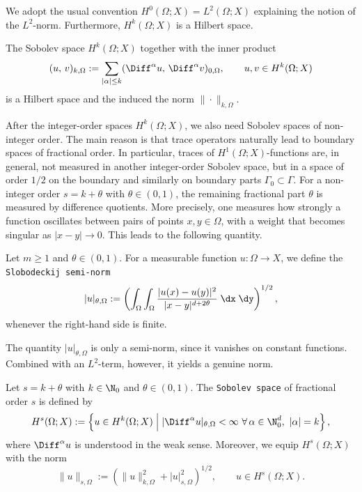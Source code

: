 We adopt the usual convention $H^0(\Omega;X) = L^2(\Omega;X)$ explaining the notion of the $L^2$-norm. Furthermore, $H^k(\Omega;X)$ is a Hilbert space.

\begin{proposition}
	The Sobolev space $H^k(\Omega;X)$ together with the inner product
	\begin{equation*}
		(u,\, v)_{k,\Omega}:= \sum_{|\alpha|\le k}(\Diff^\alpha u,\, \Diff^\alpha v)_{0,\Omega},\qquad u,v\in H^k(\Omega;X)
	\end{equation*}
	is a Hilbert space and the induced the norm $\|\cdot\|_{k,\Omega}$.
	\eop
\end{proposition}

After the integer-order spaces $H^k(\Omega;X)$, we also need Sobolev spaces of non-integer order. The main reason is that trace operators naturally lead to boundary spaces of fractional order. In particular, traces of $H^1(\Omega;X)$-functions are, in general, not measured in another integer-order Sobolev space, but in a space of order $1/2$ on the boundary and similarly on boundary parts $\Gamma_0\subset\Gamma$. For a non-integer order $s=k+\theta$ with $\theta\in(0,1)$, the remaining fractional part $\theta$ is measured by difference quotients. More precisely, one measures how strongly a function oscillates between pairs of points $x,y\in\Omega$, with a weight that becomes singular as $|x-y|\to 0$. This leads to the following quantity.

\begin{definition}
	Let $m\ge 1$ and $\theta\in(0,1)$. For a measurable function $u:\Omega\to X$, we define the {\tt Slobodeckij semi-norm}
	\begin{equation*}
		|u|_{\theta,\Omega}
		:=
		\left(\int_\Omega\int_\Omega \frac{|u(x)-u(y)|^2}{|x-y|^{d+2\theta}}\;\dx\;\dy\right)^{1/2},
	\end{equation*}
	whenever the right-hand side is finite.
\end{definition}

The quantity $|u|_{\theta,\Omega}$ is only a semi-norm, since it vanishes on constant functions. Combined with an $L^2$-term, however, it yields a genuine norm.

\begin{definition}\label{def:fractionalsobolev}
	Let $s=k+\theta$ with $k\in\N_0$ and $\theta\in(0,1)$. The {\tt Sobolev space} of fractional order $s$ is defined by
	\begin{equation*}
		H^s(\Omega;X)
		:=
		\left\{
		u\in H^k(\Omega;X)\;\middle|\; |\Diff^\alpha u|_{\theta,\Omega}<\infty \ \forall\,\alpha\in\N_0^d,\ |\alpha|=k
		\right\},
	\end{equation*}
	where $\Diff^\alpha u$ is understood in the weak sense. Moreover, we equip $H^s(\Omega;X)$ with the norm
	\begin{equation*}
		\|u\|_{s,\Omega}
		:=
		\left(
		\|u\|_{k,\Omega}^2 + |u|_{s,\Omega}^2
		\right)^{1/2},
		\qquad u\in H^s(\Omega;X).
	\end{equation*}
\end{definition}



